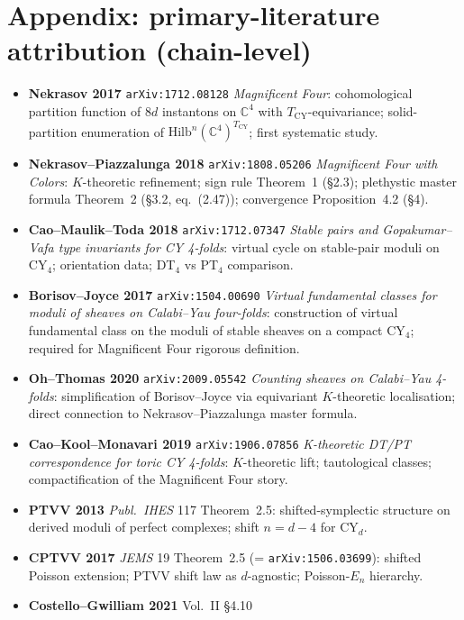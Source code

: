 \documentclass[11pt]{article}
\providecommand{\C}{\mathbb{C}}
\providecommand{\Hilb}{\mathrm{Hilb}}
\theoremstyle{definition}
\begin{document}
\section{Appendix: primary-literature attribution (chain-level)}
\label{sec:prim-lit-attribution}

\begin{itemize}[leftmargin=2em]
  \item \textbf{Nekrasov 2017} \texttt{arXiv:1712.08128}
  \emph{Magnificent Four}: cohomological partition function of $8d$
  instantons on $\C^4$ with $T_{\mathrm{CY}}$-equivariance; solid-partition
  enumeration of $\Hilb^n(\C^4)^{T_{\mathrm{CY}}}$; first systematic
  study.
  \item \textbf{Nekrasov--Piazzalunga 2018} \texttt{arXiv:1808.05206}
  \emph{Magnificent Four with Colors}: $K$-theoretic refinement;
  sign rule Theorem~1 (\S 2.3); plethystic master formula Theorem~2
  (\S 3.2, eq.~(2.47)); convergence Proposition~4.2 (\S 4).
  \item \textbf{Cao--Maulik--Toda 2018} \texttt{arXiv:1712.07347}
  \emph{Stable pairs and Gopakumar--Vafa type invariants for CY 4-folds}:
  virtual cycle on stable-pair moduli on CY$_4$; orientation data;
  DT$_4$ vs PT$_4$ comparison.
  \item \textbf{Borisov--Joyce 2017} \texttt{arXiv:1504.00690}
  \emph{Virtual fundamental classes for moduli of sheaves on
  Calabi--Yau four-folds}: construction of virtual fundamental class
  on the moduli of stable sheaves on a compact CY$_4$; required for
  Magnificent Four rigorous definition.
  \item \textbf{Oh--Thomas 2020} \texttt{arXiv:2009.05542}
  \emph{Counting sheaves on Calabi--Yau 4-folds}: simplification of
  Borisov--Joyce via equivariant $K$-theoretic localisation; direct
  connection to Nekrasov--Piazzalunga master formula.
  \item \textbf{Cao--Kool--Monavari 2019} \texttt{arXiv:1906.07856}
  \emph{K-theoretic DT/PT correspondence for toric CY 4-folds}:
  $K$-theoretic lift; tautological classes; compactification of the
  Magnificent Four story.
  \item \textbf{PTVV 2013} \emph{Publ.\ IHES} 117 Theorem~2.5:
  shifted-symplectic structure on derived moduli of perfect complexes;
  shift $n = d - 4$ for CY$_d$.
  \item \textbf{CPTVV 2017} \emph{JEMS} 19 Theorem~2.5
  (= \texttt{arXiv:1506.03699}): shifted Poisson extension; PTVV
  shift law as $d$-agnostic; Poisson-$E_n$ hierarchy.
  \item \textbf{Costello--Gwilliam 2021} Vol.~II \S 4.10

\end{itemize}
\end{document}
